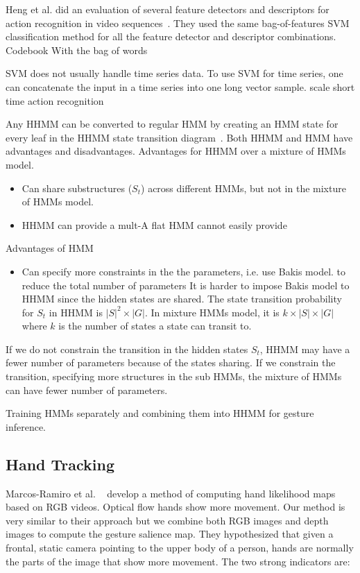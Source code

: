 \documentclass{sigchi}
\begin{document}
Heng et al. did an evaluation of several feature detectors and descriptors for action
recognition in video sequences~\cite{wang2009}. They used the same bag-of-features SVM classification
method for all the feature detector and descriptor combinations. 
Codebook With the bag of words

SVM does not usually handle time series data. To use SVM for time series, one
can concatenate the input in a time series into one long vector sample. scale
short time 
action recognition

Any HHMM can be converted to regular HMM by creating an HMM state for every leaf in the HHMM
state transition diagram~\cite{murphy02}. Both HHMM and HMM have advantages and disadvantages. Advantages for HHMM
over a mixture of HMMs model.
\begin{itemize}
  \item Can share substructures ($S_t$) across different HMMs, but not in the mixture of HMMs model.
  \item HHMM can provide a mult-A flat HMM cannot easily provide 
\end{itemize}

Advantages of HMM
\begin{itemize}
  \item Can specify more constraints in the the parameters, i.e. use Bakis model. to reduce the total number of parameters
It is harder to impose Bakis model to HHMM since the hidden states are shared. The state transition probability for $S_t$ in HHMM
is $|S|^2 \times |G| $. In mixture HMMs model, it is $k\times |S|\times|G|$ where $k$ is the number of states a state can transit to. 
\end{itemize}

If we do not constrain the transition in the hidden states $S_t$, HHMM may have a fewer number of parameters because of the states sharing.
If we constrain the transition, specifying more structures in the sub HMMs, the mixture of HMMs can have fewer number of parameters.

Training HMMs separately and combining them into HHMM for gesture inference.

\subsection{Hand Tracking}
Marcos-Ramiro et al. ~\cite{marcos2013} develop a method of computing hand likelihood maps based on RGB videos. Optical flow
hands show more movement. Our method is very similar to their approach but we combine both RGB images and depth images to compute
the gesture salience map. They hypothesized that given a frontal, static camera pointing to the upper body of a person, hands are
normally the parts of the image that show more movement. The two strong indicators are: 
\end{document}
